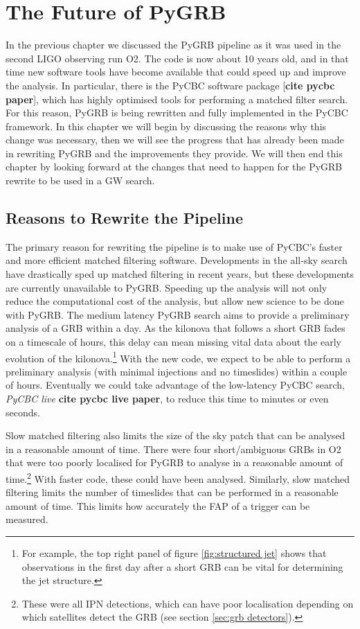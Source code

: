 \documentclass[11pt]{cuthesis}
\begin{document}
\chapter{The Future of PyGRB} \label{chap:pygrb future}
In the previous chapter we discussed the PyGRB pipeline as it was used in the second LIGO observing run O2. The code is now about 10 years old, and in that time new software tools have become available that could speed up and improve the analysis. In particular, there is the PyCBC software package [\textbf{cite pycbc paper}], which has highly optimised tools for performing a matched filter search. For this reason, PyGRB is being rewritten and fully implemented in the PyCBC framework. In this chapter we will begin by discussing the reasons why this change was necessary, then we will see the progress that has already been made in rewriting PyGRB and the improvements they provide. We will then end this chapter by looking forward at the changes that need to happen for the PyGRB rewrite to be used in a GW search.


\section{Reasons to Rewrite the Pipeline}
The primary reason for rewriting the pipeline is to make use of PyCBC's faster and more efficient matched filtering software. Developments in the all-sky search have drastically sped up matched filtering in recent years, but these developments are currently unavailable to PyGRB. Speeding up the analysis will not only reduce the computational cost of the analysis, but allow new science to be done with PyGRB. The medium latency PyGRB search aims to provide a preliminary analysis of a GRB within a day. As the kilonova that follows a short GRB fades on a timescale of hours, this delay can mean missing vital data about the early evolution of the kilonova.\footnote{For example, the top right panel of figure \ref{fig:structured jet} shows that observations in the first day after a short GRB can be vital for determining the jet structure.} With the new code, we expect to be able to perform a preliminary analysis (with minimal injections and no timeslides) within a couple of hours. Eventually we could take advantage of the low-latency PyCBC search, \textit{PyCBC live} \textbf{cite pycbc live paper}, to reduce this time to minutes or even seconds. 

Slow matched filtering also limits the size of the sky patch that can be analysed in a reasonable amount of time. There were four short/ambiguous GRBs in O2 that were too poorly localised for PyGRB to analyse in a reasonable amount of time.\footnote{These were all IPN detections, which can have poor localisation depending on which satellites detect the GRB (see section \ref{sec:grb detectors}).} With faster code, these could have been analysed. Similarly, slow matched filtering limits the number of timeslides that can be performed in a reasonable amount of time. This limits how accurately the FAP of a trigger can be measured.
\end{document}
